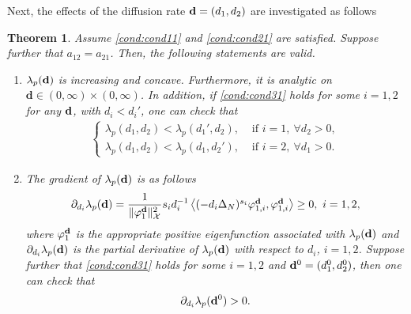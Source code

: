 \documentclass[a4paper,11pt]{amsart}
\newtheorem{theorem}{Theorem}
\theoremstyle{definition}
\numberwithin{equation}{section}
\theoremstyle{definition}
\begin{document}
Next, the effects of the diffusion rate ${\bf d}=(d_1,d_2)$ are investigated as follows
\begin{theorem}\label{deffect}
Assume \ref{cond:cond11} and \ref{cond:cond21} are satisfied. Suppose further that $a_{12}=a_{21}$. Then, the following statements are valid.

\begin{enumerate}[label=(\roman*)]
\item \label{monotone} $\lambda_p({\bf d})$ is increasing and concave. Furthermore, it is analytic on $\textbf{d}\in (0,\infty)\times (0,\infty)$. In addition, if \ref{cond:cond31} holds for some $i=1,2$ for any ${\bf d}$, with $d_i<d_i'$, one can check that
\begin{align*}
\left\{\begin{array}{llll}
\lambda_p(d_1,d_2)<\lambda_p(d_1',d_2),& \text{ if }i=1,~\forall d_2>0,\\
\lambda_p(d_1,d_2)<\lambda_p(d_1,d_2'),&\text{ if }i=2,~\forall d_1>0.
\end{array}\right.
\end{align*}

\item \label{derivative} The gradient of $\lambda_p ({\bf d})$ is as follows
\begin{align*}
\begin{array}{lllll}
\partial_{d_i}\lambda_p({\bf d})=\dfrac{1}{\|\varphi _{1}^{\bf d}\|_{\mathcal{X}}^2}s_i d_i^{-1} \left<(-d_i\Delta_N)^{s_i}\varphi _{1,i}^{\bf d},\varphi_{1,i}^{\bf d}\right>\geq 0,~i=1,2,
\end{array}
\end{align*}
 where $\varphi_1^{\bf d}$ is the appropriate positive eigenfunction associated with $\lambda_p({\bf d})$ and $\partial_{d_i}\lambda_p({\bf d})$ is the partial derivative of $\lambda_p({\bf d})$ with respect to $d_i$, $i=1,2$. Suppose further that \ref{cond:cond31} holds for some $i=1,2$ and ${\bf d}^0=(d_1^0,d_2^0)$, then one can check that
 \begin{align*}
\partial_{d_i}\lambda_p({\bf d}^0)>0.
 \end{align*}
 



\end{enumerate}
\end{theorem}
\end{document}
